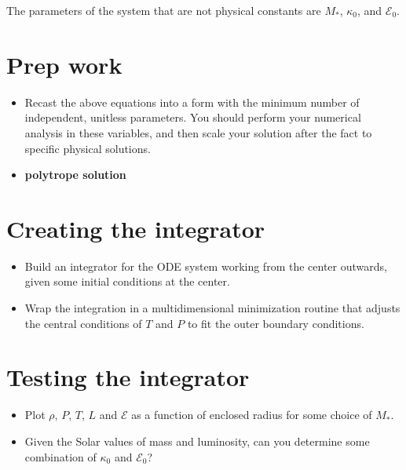 \documentclass[11pt, preprint]{aastex}
\begin{document}
The parameters of the system that are not physical constants are
$M_\ast$, $\kappa_0$,  and $\mathcal{E}_0$.

\section{Prep work}

\begin{itemize}
\item Recast the above equations into a form with the minimum number
  of independent, unitless parameters.  You should perform your
  numerical analysis in these variables, and then scale your solution
  after the fact to specific physical solutions.
\item {\bf polytrope solution}
\end{itemize}

\section{Creating the integrator}

\begin{itemize}
\item Build an integrator for the ODE system working from the center
  outwards, given some initial conditions at the center.
\item Wrap the integration in a multidimensional minimization routine
  that adjusts the central conditions of $T$ and $P$ to fit the outer
  boundary conditions.
\end{itemize}

\section{Testing the integrator}

\begin{itemize}
\item Plot $\rho$, $P$, $T$, $L$ and $\mathcal{E}$ as a function of
  enclosed radius for some choice of $M_\ast$.
\item Given the Solar values of mass and luminosity, can you determine
  some combination of $\kappa_0$ and $\mathcal{E}_0$?
\end{itemize}
\end{document}
